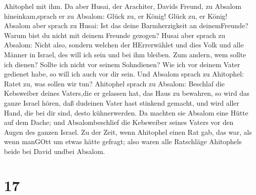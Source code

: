 Ahitophel mit ihm.  Da aber Husai, der Arachiter, Davids
Freund, zu Absalom hineinkam,sprach er zu Absalom: Glück zu, er König!
Glück zu, er König!  Absalom aber sprach zu Husai: Ist das
deine Barmherzigkeit an deinemFreunde? Warum bist du nicht mit deinem
Freunde gezogen?  Husai aber sprach zu Absalom: Nicht also,
sondern welchen der HErrerwählet und dies Volk und alle Männer in
Israel, des will ich sein und bei ihm bleiben.  Zum andern,
wem sollte ich dienen? Sollte ich nicht vor seinem Sohndienen? Wie ich
vor deinem Vater gedienet habe, so will ich auch vor dir sein.
 Und Absalom sprach zu Ahitophel: Ratet zu, was sollen wir
tun?  Ahitophel sprach zu Absalom: Beschlaf die Kebsweiber
deines Vaters,die er gelassen hat, das Haus zu bewahren, so wird das
ganze Israel hören, daß dudeinen Vater hast stinkend gemacht, und wird
aller Hand, die bei dir sind, desto kühnerwerden.  Da
machten sie Absalom eine Hütte auf dem Dache; und Absalombeschlief die
Kebsweiber seines Vaters vor den Augen des ganzen Israel. 
Zu der Zeit, wenn Ahitophel einen Rat gab, das war, als wenn manGOtt um
etwas hätte gefragt; also waren alle Ratschläge Ahitophels beide bei
David undbei Absalom.

\hypertarget{section-16}{%
\section{17}\label{section-16}}


